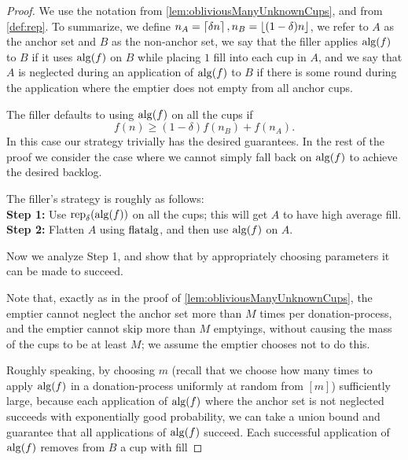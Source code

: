 \begin{proof}
  We use the notation from \cref{lem:obliviousManyUnknownCups},
  and from \cref{def:rep}. To summarize, we define $n_A =
  \left\lceil \delta n \right\rceil, n_B = \left\lfloor (1-\delta)n \right\rfloor$, we refer to $A$ as
  the anchor set and $B$ as the non-anchor set, we say that the
  filler applies $\operatorname{\text{\textup{alg}}}(f)$ to $B$ if it uses $\operatorname{\text{\textup{alg}}}(f)$ on $B$
  while placing $1$ fill into each cup in $A$, and we say that
  $A$ is neglected during an application of $\operatorname{\text{\textup{alg}}}(f)$ to $B$ if
  there is some round during the application where the emptier
  does not empty from all anchor cups.

  The filler defaults to using $\operatorname{\text{\textup{alg}}}(f)$ on all the cups if 
  $$f(n) \ge (1-\delta) f(n_B) + f(n_A).$$
  In this case our strategy trivially has the desired guarantees. 
  In the rest of the proof we consider the case where we cannot
  simply fall back on $\operatorname{\text{\textup{alg}}}(f)$ to achieve the desired backlog.

  The filler's strategy is roughly as follows:\\
  \textbf{Step 1:} Use $\operatorname{\text{\textup{rep}}}_\delta(\operatorname{\text{\textup{alg}}}(f))$ on all the cups;
  this will get $A$ to have high average fill.\\
  \textbf{Step 2:} Flatten $A$ using $\operatorname{\text{\textup{flatalg}}}$, and then use
  $\operatorname{\text{\textup{alg}}}(f)$ on $A$.

  Now we analyze Step 1, and show that by appropriately choosing
  parameters it can be made to succeed.

  Note that, exactly as in the proof of
  \cref{lem:obliviousManyUnknownCups}, the emptier cannot neglect
  the anchor set more than $M$ times per donation-process, and
  the emptier cannot skip more than $M$ emptyings, without
  causing the mass of the cups to be at least $M$; we assume the
  emptier chooses not to do this.

  Roughly speaking, by choosing $m$ (recall that we choose how
  many times to apply $\operatorname{\text{\textup{alg}}}(f)$ in a donation-process uniformly
  at random from $[m]$) sufficiently large, because each
  application of $\operatorname{\text{\textup{alg}}}(f)$ where the anchor set is not neglected
  succeeds with exponentially good probability, we can take a
  union bound and guarantee that all applications of $\operatorname{\text{\textup{alg}}}(f)$
  succeed. Each successful application of $\operatorname{\text{\textup{alg}}}(f)$ removes from
  $B$ a cup with fill 



\end{proof}

